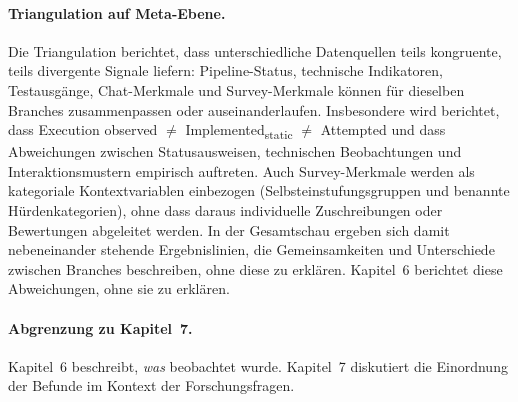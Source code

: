 \paragraph{Triangulation auf Meta-Ebene.}
Die Triangulation berichtet, dass unterschiedliche Datenquellen teils kongruente, teils divergente Signale liefern: Pipeline-Status, technische Indikatoren, Testausgänge, Chat-Merkmale und Survey-Merkmale können für dieselben Branches zusammenpassen oder auseinanderlaufen.
Insbesondere wird berichtet, dass Execution observed $\neq$ Implemented\textsubscript{static} $\neq$ Attempted und dass Abweichungen zwischen Statusausweisen, technischen Beobachtungen und Interaktionsmustern empirisch auftreten.
Auch Survey-Merkmale werden als kategoriale Kontextvariablen einbezogen (Selbsteinstufungsgruppen und benannte Hürdenkategorien), ohne dass daraus individuelle Zuschreibungen oder Bewertungen abgeleitet werden.
In der Gesamtschau ergeben sich damit nebeneinander stehende Ergebnislinien, die Gemeinsamkeiten und Unterschiede zwischen Branches beschreiben, ohne diese zu erklären.
Kapitel~6 berichtet diese Abweichungen, ohne sie zu erklären.

\paragraph{Abgrenzung zu Kapitel~7.}
Kapitel~6 beschreibt, \emph{was} beobachtet wurde. Kapitel~7 diskutiert die Einordnung der Befunde im Kontext der Forschungsfragen.

